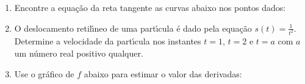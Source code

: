 \documentclass[a4paper]{article}
\newcommand{\ds}{\displaystyle}
\begin{document}
%
%
\begin{enumerate}
    \vspace{0.5cm}
    \item Encontre a equa\c{c}\~ao da reta tangente as curvas abaixo nos pontos
        dados:

        \noindent{}

    \vspace{0.5cm}
    \item O deslocamento retil\'{\i}neo de uma part\'{\i}cula \'e dado pela equa\c{c}\~ao
        $s(t)=\ds\frac{1}{t^2}$. Determine a velocidade da part\'{\i}cula nos
        instantes $t=1$, $t=2$ e $t=a$ com $a$ um n\'umero real positivo
        qualquer.

    \vspace{0.5cm}
    \item Use o gr\'afico de $f$ abaixo para estimar o valor das derivadas:

        \noindent{}


\end{enumerate}
\end{document}
